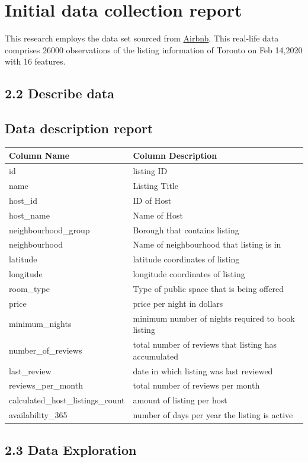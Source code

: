 \hypertarget{initial-data-collection-report}{%
\section{Initial data collection
report}\label{initial-data-collection-report}}

This research employs the data set sourced from
\href{http://insideairbnb.com/get-the-data.html}{Airbnb}. This real-life
data comprises 26000 observations of the listing information of Toronto
on Feb 14,2020 with 16 features.

\hypertarget{describe-data}{%
\subsection{2.2 Describe data}\label{describe-data}}

\hypertarget{data-description-report}{%
\subsection{Data description report}\label{data-description-report}}

\begin{longtable}[]{@{}ll@{}}
\toprule
Column Name & Column Description\tabularnewline
\midrule
\endhead
id & listing ID\tabularnewline
name & Listing Title\tabularnewline
host\_id & ID of Host\tabularnewline
host\_name & Name of Host\tabularnewline
neighbourhood\_group & Borough that contains listing\tabularnewline
neighbourhood & Name of neighbourhood that listing is in\tabularnewline
latitude & latitude coordinates of listing\tabularnewline
longitude & longitude coordinates of listing\tabularnewline
room\_type & Type of public space that is being offered\tabularnewline
price & price per night in dollars\tabularnewline
minimum\_nights & minimum number of nights required to book
listing\tabularnewline
number\_of\_reviews & total number of reviews that listing has
accumulated\tabularnewline
last\_review & date in which listing was last reviewed\tabularnewline
reviews\_per\_month & total number of reviews per month\tabularnewline
calculated\_host\_listings\_count & amount of listing per
host\tabularnewline
availability\_365 & number of days per year the listing is
active\tabularnewline
\bottomrule
\end{longtable}

\hypertarget{data-exploration}{%
\subsection{2.3 Data Exploration}\label{data-exploration}}

